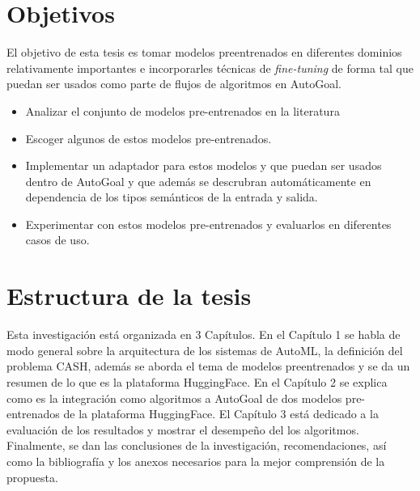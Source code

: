 \section*{Objetivos}
El objetivo de esta tesis es tomar modelos preentrenados en diferentes dominios relativamente importantes e incorporarles técnicas de \textit{fine-tuning} de forma tal que puedan ser usados como parte de flujos de algoritmos en AutoGoal.\\

\begin{itemize}

\item Analizar el conjunto de modelos pre-entrenados en la literatura
\item Escoger algunos de estos modelos pre-entrenados.
\item Implementar un adaptador para estos modelos y que puedan ser usados dentro de AutoGoal y que además se descrubran automáticamente en dependencia de los tipos semánticos de la entrada y salida.
\item Experimentar con estos modelos pre-entrenados y evaluarlos en diferentes casos de uso.

\end{itemize}

\section*{Estructura de la tesis}
Esta investigación está organizada en 3 Capítulos. En el Capítulo 1 se habla de modo general sobre la arquitectura de los sistemas de AutoML, la definición del problema CASH, además se aborda el tema de modelos preentrenados y se da un resumen de lo que es la plataforma HuggingFace. En el Capítulo 2 se explica como es la integración como algoritmos a AutoGoal de dos modelos pre-entrenados de la plataforma HuggingFace. El Capítulo 3 está dedicado a la evaluación de los resultados y mostrar el desempeño del los algoritmos. Finalmente, se dan las conclusiones de la investigación, recomendaciones, así como la bibliografía y los anexos necesarios para la mejor comprensión de la propuesta.